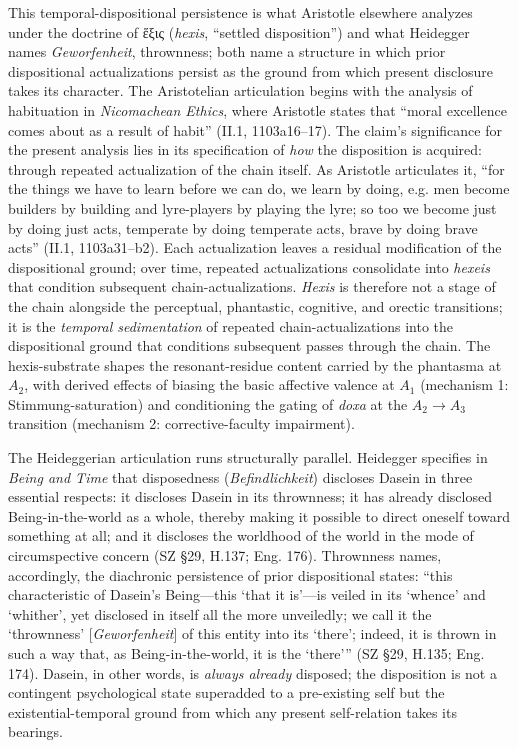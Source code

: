 \documentclass{article}
\begin{document}
This temporal-dispositional persistence is what Aristotle elsewhere analyzes under the doctrine of ἕξις (\textit{hexis}, ``settled disposition'') and what Heidegger names \textit{Geworfenheit}, thrownness; both name a structure in which prior dispositional actualizations persist as the ground from which present disclosure takes its character. The Aristotelian articulation begins with the analysis of habituation in \textit{Nicomachean Ethics}, where Aristotle states that ``moral excellence comes about as a result of habit'' (II.1, 1103a16--17). The claim's significance for the present analysis lies in its specification of \textit{how} the disposition is acquired: through repeated actualization of the chain itself. As Aristotle articulates it, ``for the things we have to learn before we can do, we learn by doing, e.g. men become builders by building and lyre-players by playing the lyre; so too we become just by doing just acts, temperate by doing temperate acts, brave by doing brave acts'' (II.1, 1103a31--b2). Each actualization leaves a residual modification of the dispositional ground; over time, repeated actualizations consolidate into \textit{hexeis} that condition subsequent chain-actualizations. \textit{Hexis} is therefore not a stage of the chain alongside the perceptual, phantastic, cognitive, and orectic transitions; it is the \textit{temporal sedimentation} of repeated chain-actualizations into the dispositional ground that conditions subsequent passes through the chain. The hexis-substrate shapes the resonant-residue content carried by the phantasma at $A_2$, with derived effects of biasing the basic affective valence at $A_1$ (mechanism 1: Stimmung-saturation) and conditioning the gating of \textit{doxa} at the $A_2 \rightarrow A_3$ transition (mechanism 2: corrective-faculty impairment).

The Heideggerian articulation runs structurally parallel. Heidegger specifies in \textit{Being and Time} that disposedness (\textit{Befindlichkeit}) discloses Dasein in three essential respects: it discloses Dasein in its thrownness; it has already disclosed Being-in-the-world as a whole, thereby making it possible to direct oneself toward something at all; and it discloses the worldhood of the world in the mode of circumspective concern (SZ \S29, H.137; Eng. 176). Thrownness names, accordingly, the diachronic persistence of prior dispositional states: ``this characteristic of Dasein's Being---this `that it is'---is veiled in its `whence' and `whither', yet disclosed in itself all the more unveiledly; we call it the `thrownness' [\textit{Geworfenheit}] of this entity into its `there'; indeed, it is thrown in such a way that, as Being-in-the-world, it is the `there''' (SZ \S29, H.135; Eng. 174). Dasein, in other words, is \textit{always already} disposed; the disposition is not a contingent psychological state superadded to a pre-existing self but the existential-temporal ground from which any present self-relation takes its bearings.
\end{document}
